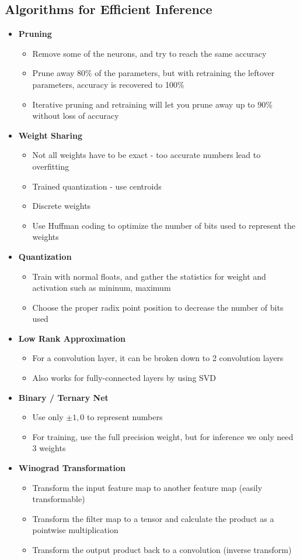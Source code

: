 \subsection{Algorithms for Efficient Inference}
\begin{itemize}
	\item \textbf{Pruning}
	\begin{itemize}
		\item Remove some of the neurons, and try to reach the same accuracy
		\item Prune away 80\% of the parameters, but with retraining the leftover parameters, accuracy is recovered to 100\%
		\item Iterative pruning and retraining will let you prune away up to 90\% without loss of accuracy
	\end{itemize}
	\item \textbf{Weight Sharing}
	\begin{itemize}
		\item Not all weights have to be exact - too accurate numbers lead to overfitting
		\item Trained quantization - use centroids
		\item Discrete weights
		\item Use Huffman coding to optimize the number of bits used to represent the weights
	\end{itemize}
	\item \textbf{Quantization}
	\begin{itemize}
		\item Train with normal floats, and gather the statistics for weight and activation such as mininum, maximum
		\item Choose the proper radix point position to decrease the number of bits used
	\end{itemize}
	\item \textbf{Low Rank Approximation}
	\begin{itemize}
		\item For a convolution layer, it can be broken down to 2 convolution layers
		\item Also works for fully-connected layers by using SVD
	\end{itemize}
	\item \textbf{Binary / Ternary Net}
	\begin{itemize}
		\item Use only $\pm 1, 0$ to represent numbers
		\item For training, use the full precision weight, but for inference we only need 3 weights
	\end{itemize}
	\item \textbf{Winograd Transformation}
	\begin{itemize}
		\item Transform the input feature map to another feature map (easily transformable)
		\item Transform the filter map to a tensor and calculate the product as a pointwise multiplication
		\item Transform the output product back to a convolution (inverse transform) 
	\end{itemize}
\end{itemize}


